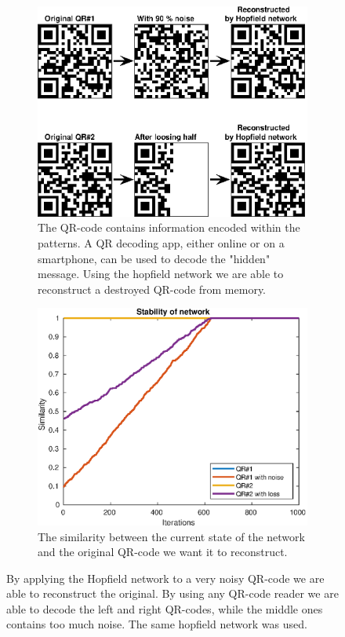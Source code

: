\begin{figure}[H]
    \centering
    \begin{subfigure}{0.49\textwidth}
        \includegraphics[width=\textwidth]{figs/qr-code}
        \caption{The QR-code contains information encoded within the patterns. A QR decoding app, either online or on a smartphone, can be used to decode the "hidden" message. Using the hopfield network we are able to reconstruct a destroyed QR-code from memory.}
        \label{fig:qr-codes}
    \end{subfigure}
    \begin{subfigure}{0.49\textwidth}
        \includegraphics[width=\textwidth]{figs/qr-code-sim}
        \caption{The similarity between the current state of the network and the original QR-code we want it to reconstruct.}
        \label{fig:qr-codes-stability}
    \end{subfigure}
    \caption{By applying the Hopfield network to a very noisy QR-code we are able to reconstruct the original. By using any QR-code reader we are able to decode the left and right QR-codes, while the middle ones contains too much noise. The same hopfield network was used.}
\end{figure}

